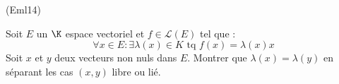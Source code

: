 \begin{tiny}(Eml14)\end{tiny} \label{exo:ev27} Soit $E$ un $\K$ espace vectoriel et $f\in \mathcal L(E)$ tel que :
\begin{displaymath}
 \forall x\in E : \exists \lambda(x)\in K \text{ tq } f(x)=\lambda(x)x
\end{displaymath}
Soit $x$ et $y$ deux vecteurs non nuls dans $E$. Montrer que $\lambda(x)=\lambda(y)$ en séparant les cas $(x,y)$ libre ou lié.